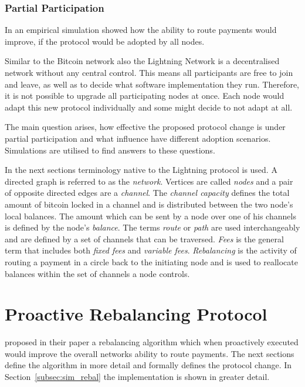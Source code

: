 \documentclass[final]{fhnwreport}       %
\begin{document}
\subsubsection{Partial Participation}
In an empirical simulation \citeauthor{pickhardt_imbalance_2019} showed how the ability to route payments would improve, if the protocol would be adopted by all nodes. 

Similar to the Bitcoin network also the Lightning Network is a decentralised network without any central control. This means all participants are free to join and leave, as well as to decide what software implementation they run. Therefore, it is not possible to upgrade all participating nodes at once. Each node would adapt this new protocol individually and some might decide to not adapt at all. 

The main question arises, how effective the proposed protocol change is under partial participation and what influence have different adoption scenarios. Simulations are utilised to find answers to these questions.

In the next sections terminology native to the Lightning protocol is used. A directed graph is referred to as the \emph{network}. Vertices are called \emph{nodes} and a pair of opposite directed edges are a \emph{channel}. The \emph{channel capacity} defines the total amount of bitcoin locked in a channel and is distributed between the two node's local balances. The amount which can be sent by a node over one of his channels is defined by the node's \emph{balance}. The terms \emph{route} or \emph{path} are used interchangeably and are defined by a set of channels that can be traversed. \emph{Fees} is the general term that includes both \emph{fixed fees} and \emph{variable fees}. \emph{Rebalancing} is the activity of routing a payment in a circle back to the initiating node and is used to reallocate balances within the set of channels a node controls.   

\newpage
\section{Proactive Rebalancing Protocol}\label{sec:rebal}
\textcite{pickhardt_imbalance_2019} proposed in their paper a rebalancing algorithm which when proactively executed would improve the overall networks ability to route payments. The next sections define the algorithm in more detail and formally defines the protocol change. In Section~\ref{subsec:sim_rebal} the implementation is shown in greater detail.
\end{document}

